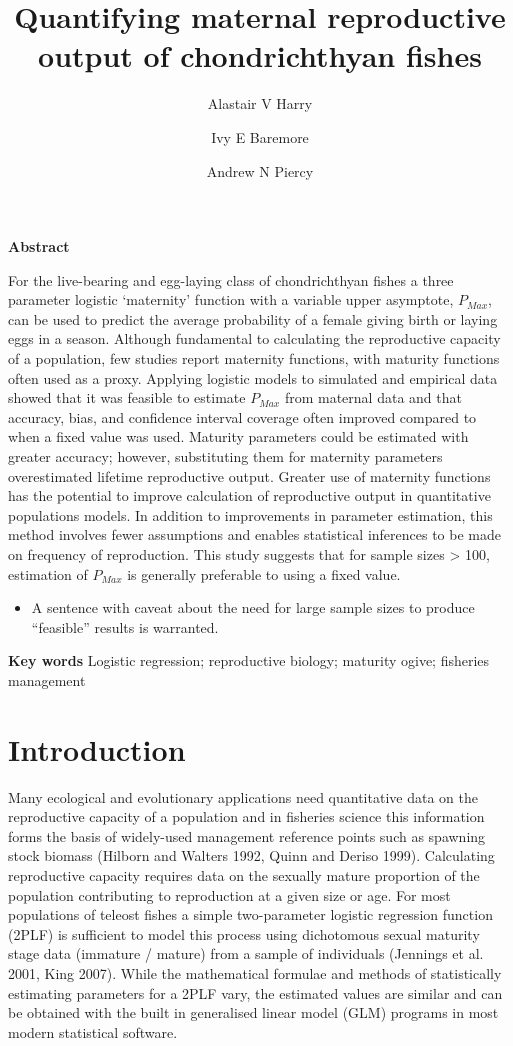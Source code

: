 \documentclass[
]{article}
\title{Quantifying maternal reproductive output of chondrichthyan fishes}
\author[1]{Alastair V Harry}
\affil{Fisheries \& Agriculture Resource Management, Department of Primary Industries and Regional Development, 39 Northside Drive, Hillarys, 6025, WA, Australia \thanks{\href{mailto:alastair.harry@gmail.com}{\nolinkurl{alastair.harry@gmail.com}}}}
\author[2]{Ivy E Baremore}
\affil{MarAlliance, Roatán, Islas de la Bahía, Honduras}
\author[3]{Andrew N Piercy}
\affil{College of Southern Maryland, La Plata MD 20646, United States}
\date{}
\providecommand{\tightlist}{%
  \setlength{\itemsep}{0pt}\setlength{\parskip}{0pt}}
\begin{document}
\maketitle

\newpage

\textbf{Abstract}

For the live-bearing and egg-laying class of chondrichthyan fishes a three parameter logistic `maternity' function with a variable upper asymptote, \(P_{Max}\), can be used to predict the average probability of a female giving birth or laying eggs in a season. Although fundamental to calculating the reproductive capacity of a population, few studies report maternity functions, with maturity functions often used as a proxy. Applying logistic models to simulated and empirical data showed that it was feasible to estimate \(P_{Max}\) from maternal data and that accuracy, bias, and confidence interval coverage often improved compared to when a fixed value was used. Maturity parameters could be estimated with greater accuracy; however, substituting them for maternity parameters overestimated lifetime reproductive output. Greater use of maternity functions has the potential to improve calculation of reproductive output in quantitative populations models. In addition to improvements in parameter estimation, this method involves fewer assumptions and enables statistical inferences to be made on frequency of reproduction. This study suggests that for sample sizes \textgreater{} 100, estimation of \(P_{Max}\) is generally preferable to using a fixed value.

\begin{itemize}
\tightlist
\item
  A sentence with caveat about the need for large sample sizes to produce ``feasible'' results is warranted.
\end{itemize}

\textbf{Key words} Logistic regression; reproductive biology; maturity ogive; fisheries management

\newpage

\section{Introduction}\label{introduction}

Many ecological and evolutionary applications need quantitative data on the reproductive capacity of a population and in fisheries science this information forms the basis of widely-used management reference points such as spawning stock biomass (Hilborn and Walters 1992, Quinn and Deriso 1999). Calculating reproductive capacity requires data on the sexually mature proportion of the population contributing to reproduction at a given size or age. For most populations of teleost fishes a simple two-parameter logistic regression function (2PLF) is sufficient to model this process using dichotomous sexual maturity stage data (immature / mature) from a sample of individuals (Jennings et al. 2001, King 2007). While the mathematical formulae and methods of statistically estimating parameters for a 2PLF vary, the estimated values are similar and can be obtained with the built in generalised linear model (GLM) programs in most modern statistical software.
\end{document}
